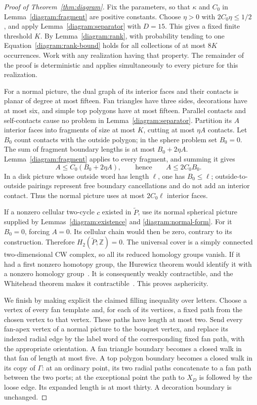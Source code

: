 \begin{proof}[Proof of Theorem~\ref{thm:diagram}]
Fix the parameters, so that $\kappa$ and $C_0$ in
Lemma~\ref{diagram:fragment} are positive constants.  Choose
$\eta>0$ with $2C_0\eta\le1/2$, and apply
Lemma~\ref{diagram:separator} with $D=15$.  This gives a fixed finite
threshold $K$.  By Lemma~\ref{diagram:rank}, with probability tending
to one Equation~\eqref{diagram:rank-bound} holds for all collections of
at most $8K$ occurrences.  Work with any realization having that
property.  The remainder of the proof is deterministic and applies
simultaneously to every picture for this realization.

For a normal picture, the dual graph of its interior faces and their
contacts is planar of degree at most fifteen.  Fan triangles have
three sides, decorations have at most six, and simple top polygons
have at most fifteen.  Parallel contacts and self-contacts cause no
problem in Lemma~\ref{diagram:separator}.  Partition its $A$ interior
faces into fragments of size at most $K$, cutting at most $\eta A$
contacts.  Let $B_0$ count contacts with the outside polygon; in the
sphere problem set $B_0=0$.  The sum of fragment boundary lengths is
at most $B_0+2\eta A$.  Lemma~\ref{diagram:fragment} applies to every
fragment, and summing it gives
\[
 A\le C_0(B_0+2\eta A),
 \qquad\text{hence}\qquad A\le2C_0 B_0.
\]
In a disk picture whose outside word has length $\ell$, one has
$B_0\le\ell$; outside-to-outside pairings represent free boundary
cancellations and do not add an interior contact.  Thus the normal
picture uses at most $2C_0\ell$ interior faces.

If a nonzero cellular two-cycle $c$ existed in $\widetilde P$, use its
normal spherical picture supplied by
Lemmas~\ref{diagram:existence} and \ref{diagram:normal-form}.
For it $B_0=0$, forcing $A=0$.  Its cellular chain would then be zero,
contrary to its construction.  Therefore
$H_2(\widetilde P;\mathbb Z)=0$.  The universal cover is a simply
connected two-dimensional CW complex, so all its reduced homology
groups vanish.  If it had a first nonzero homotopy group, the
Hurewicz theorem would identify it with a nonzero homology
group~\cite[Theorem~4.32]{Hatcher2002}.
It is consequently weakly contractible, and the Whitehead theorem
makes it contractible~\cite[Theorem~4.5]{Hatcher2002}.
This proves asphericity.

We finish by making explicit the claimed filling inequality over
letters.  Choose a vertex of every fan template and, for each of its
vertices, a fixed path from the chosen vertex to that vertex.  These
paths have length at most two.  Send every fan-apex vertex of a normal
picture to the bouquet vertex, and replace its indexed radial edge by
the label word of the corresponding fixed fan path, with the
appropriate orientation.  A fan triangle boundary becomes a closed
walk in that fan of length at most five.  A top polygon boundary
becomes a closed walk in its copy of $\Gamma$: at an ordinary point,
its two radial paths concatenate to a fan path between the two ports;
at the exceptional point the path to $X_D$ is followed by the loose
edge.  Its expanded length is at most thirty.  A decoration boundary
is unchanged.


\end{proof}
